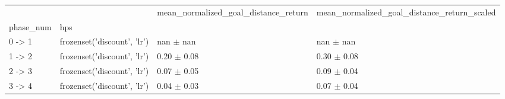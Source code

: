 \begin{tabular}{llll}
\toprule
 &  & mean_normalized_goal_distance_return & mean_normalized_goal_distance_return_scaled \\
phase_num & hps &  &  \\
\midrule
0 -> 1 & frozenset({'discount', 'lr'}) & nan $\pm$ nan & nan $\pm$ nan \\
\cline{1-4}
1 -> 2 & frozenset({'discount', 'lr'}) & 0.20 $\pm$ 0.08 & 0.30 $\pm$ 0.08 \\
\cline{1-4}
2 -> 3 & frozenset({'discount', 'lr'}) & 0.07 $\pm$ 0.05 & 0.09 $\pm$ 0.04 \\
\cline{1-4}
3 -> 4 & frozenset({'discount', 'lr'}) & 0.04 $\pm$ 0.03 & 0.07 $\pm$ 0.04 \\
\cline{1-4}
\bottomrule
\end{tabular}
